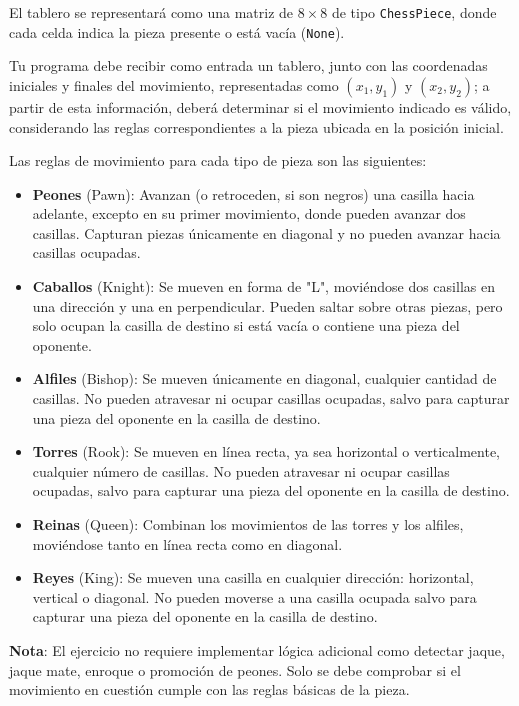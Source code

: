 \begin{enumerate}
    El tablero se representará como una matriz de \(8 \times 8\) de tipo \texttt{ChessPiece}, donde cada celda indica la pieza presente o está vacía (\texttt{None}).

    Tu programa debe recibir como entrada un tablero, junto con las coordenadas iniciales y finales del movimiento, representadas como \((x_1, y_1)\) y \((x_2, y_2)\); a partir de esta información, deberá determinar si el movimiento indicado es válido, considerando las reglas correspondientes a la pieza ubicada en la posición inicial.

    Las reglas de movimiento para cada tipo de pieza son las siguientes:
    \begin{itemize}
        \item \textbf{Peones} (Pawn): Avanzan (o retroceden, si son negros) una casilla hacia adelante, excepto en su primer movimiento, donde pueden avanzar dos casillas. Capturan piezas únicamente en diagonal y no pueden avanzar hacia casillas ocupadas.
        \item \textbf{Caballos} (Knight): Se mueven en forma de "L", moviéndose dos casillas en una dirección y una en perpendicular. Pueden saltar sobre otras piezas, pero solo ocupan la casilla de destino si está vacía o contiene una pieza del oponente.
        \item \textbf{Alfiles} (Bishop): Se mueven únicamente en diagonal, cualquier cantidad de casillas. No pueden atravesar ni ocupar casillas ocupadas, salvo para capturar una pieza del oponente en la casilla de destino.
        \item \textbf{Torres} (Rook): Se mueven en línea recta, ya sea horizontal o verticalmente, cualquier número de casillas. No pueden atravesar ni ocupar casillas ocupadas, salvo para capturar una pieza del oponente en la casilla de destino.
        \item \textbf{Reinas} (Queen): Combinan los movimientos de las torres y los alfiles, moviéndose tanto en línea recta como en diagonal.
        \item \textbf{Reyes} (King): Se mueven una casilla en cualquier dirección: horizontal, vertical o diagonal. No pueden moverse a una casilla ocupada salvo para capturar una pieza del oponente en la casilla de destino.
    \end{itemize}
    
    \textbf{Nota}: El ejercicio no requiere implementar lógica adicional como detectar jaque, jaque mate, enroque o promoción de peones. Solo se debe comprobar si el movimiento en cuestión cumple con las reglas básicas de la pieza.


\end{enumerate}
